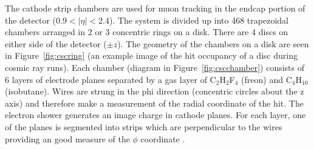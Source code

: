 The cathode strip chambers are used for muon tracking in the endcap portion of the detector ($0.9<|\eta|<2.4$). The system is divided up into 468 trapezoidal chambers arranged in 2 or 3 concentric rings on a disk. There are 4 discs on either side of the detector ($\pm z$). The geometry of the chambers on a disk are seen in Figure~\ref{fig:cscring} (an example image of the hit occupancy of a disc during cosmic ray runs). Each chamber (diagram in Figure~\ref{fig:cscchamber}) consists of 6 layers of electrode planes separated by a gas layer of C$_{2}$H$_{2}$F$_{4}$ (freon) and C$_{4}$H$_{10}$ (isobutane). Wires are strung in the phi direction (concentric circles about the z axis) and therefore make a measurement of the radial coordinate of the hit. The electron shower generates an image charge in cathode planes. For each layer, one of the planes is segmented into strips which are perpendicular to the wires providing an good measure of the $\phi$ coordinate \cite{cscperformance}.

